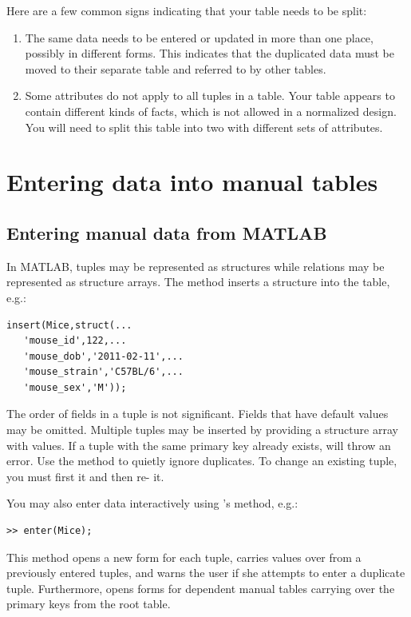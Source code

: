 \documentclass[10pt]{article}
\begin{document}
Here are a few common signs indicating that your table needs to be split:
\begin{enumerate}
\item The same data needs to be entered or updated in more than one place, possibly in different forms.  This indicates that the duplicated data must be moved to their separate table and referred to by other tables. 
\item Some attributes do not apply to all tuples in a table.  Your table appears to contain different kinds of facts, which is not allowed in a normalized design. You will need to split this table into two with different sets of attributes. 
\end{enumerate}




\newpage\section{Entering data into manual tables}\label{sec:entry}
\subsection{Entering manual data from MATLAB}
In MATLAB, tuples may be represented as structures while relations may be represented as structure arrays.  The  method  inserts a structure into the table, e.g.:
\begin{lstlisting}
insert(Mice,struct(...
   'mouse_id',122,...
   'mouse_dob','2011-02-11',...
   'mouse_strain','C57BL/6',...
   'mouse_sex','M'));
\end{lstlisting}

The order of fields in a tuple is not significant. Fields that have default values may be omitted.  Multiple tuples may be inserted by providing a structure array with values. If a tuple with the same primary key already exists,  will throw an error.  Use the  method to quietly ignore duplicates.  To change an existing tuple, you must first  it and then re- it.

You may also enter data interactively using 's  method, e.g.:
\begin{lstlisting}
>> enter(Mice);
\end{lstlisting}  
This method opens a new form for each tuple, carries values over from a previously entered tuples, and warns the user if she attempts to enter a duplicate tuple. Furthermore,  opens forms for dependent manual tables carrying over the primary keys from the root table.
\end{document}
